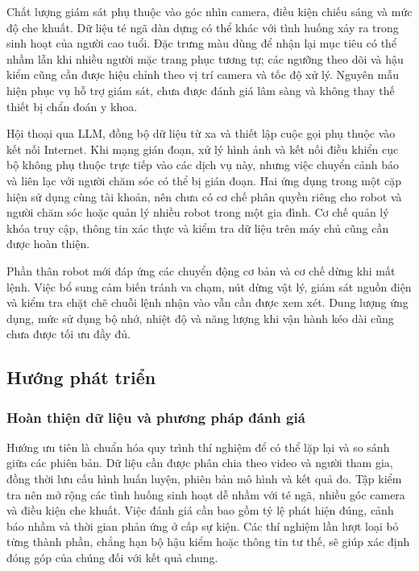Chất lượng giám sát phụ thuộc vào góc nhìn camera, điều kiện chiếu sáng và mức độ che khuất. Dữ liệu té ngã dàn dựng có thể khác với tình huống xảy ra trong sinh hoạt của người cao tuổi. Đặc trưng màu dùng để nhận lại mục tiêu có thể nhầm lẫn khi nhiều người mặc trang phục tương tự; các ngưỡng theo dõi và hậu kiểm cũng cần được hiệu chỉnh theo vị trí camera và tốc độ xử lý. Nguyên mẫu hiện phục vụ hỗ trợ giám sát, chưa được đánh giá lâm sàng và không thay thế thiết bị chẩn đoán y khoa.

Hội thoại qua LLM, đồng bộ dữ liệu từ xa và thiết lập cuộc gọi phụ thuộc vào kết nối Internet. Khi mạng gián đoạn, xử lý hình ảnh và kết nối điều khiển cục bộ không phụ thuộc trực tiếp vào các dịch vụ này, nhưng việc chuyển cảnh báo và liên lạc với người chăm sóc có thể bị gián đoạn. Hai ứng dụng trong một cặp hiện sử dụng cùng tài khoản, nên chưa có cơ chế phân quyền riêng cho robot và người chăm sóc hoặc quản lý nhiều robot trong một gia đình. Cơ chế quản lý khóa truy cập, thông tin xác thực và kiểm tra dữ liệu trên máy chủ cũng cần được hoàn thiện.

Phần thân robot mới đáp ứng các chuyển động cơ bản và cơ chế dừng khi mất lệnh. Việc bổ sung cảm biến tránh va chạm, nút dừng vật lý, giám sát nguồn điện và kiểm tra chặt chẽ chuỗi lệnh nhận vào vẫn cần được xem xét. Dung lượng ứng dụng, mức sử dụng bộ nhớ, nhiệt độ và năng lượng khi vận hành kéo dài cũng chưa được tối ưu đầy đủ.

\subsection{Hướng phát triển}

\subsubsection{Hoàn thiện dữ liệu và phương pháp đánh giá}

Hướng ưu tiên là chuẩn hóa quy trình thí nghiệm để có thể lặp lại và so sánh giữa các phiên bản. Dữ liệu cần được phân chia theo video và người tham gia, đồng thời lưu cấu hình huấn luyện, phiên bản mô hình và kết quả đo. Tập kiểm tra nên mở rộng các tình huống sinh hoạt dễ nhầm với té ngã, nhiều góc camera và điều kiện che khuất. Việc đánh giá cần bao gồm tỷ lệ phát hiện đúng, cảnh báo nhầm và thời gian phản ứng ở cấp sự kiện. Các thí nghiệm lần lượt loại bỏ từng thành phần, chẳng hạn bộ hậu kiểm hoặc thông tin tư thế, sẽ giúp xác định đóng góp của chúng đối với kết quả chung.

